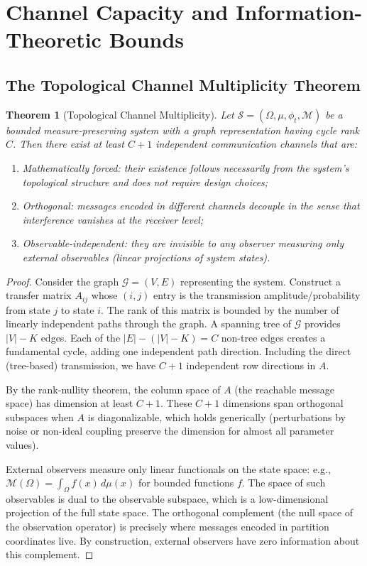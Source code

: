 \documentclass[11pt,twocolumn,a4paper]{article}
\newtheorem{theorem}{Theorem}[section]
\theoremstyle{definition}
\newcommand{\calM}{\mathcal{M}}
\newcommand{\calG}{\mathcal{G}}
\begin{document}
\section{Channel Capacity and Information-Theoretic Bounds}
\label{sec:capacity}

\subsection{The Topological Channel Multiplicity Theorem}

\begin{theorem}[Topological Channel Multiplicity]
\label{thm:topo-mult}
Let $\mathcal{S} = (\Omega, \mu, \phi_t, \calM)$ be a bounded measure-preserving system with a graph representation having cycle rank $C$. Then there exist at least $C+1$ independent communication channels that are:
\begin{enumerate}[nosep,label=(\roman*)]
\item \emph{Mathematically forced}: their existence follows necessarily from the system's topological structure and does not require design choices;
\item \emph{Orthogonal}: messages encoded in different channels decouple in the sense that interference vanishes at the receiver level;
\item \emph{Observable-independent}: they are invisible to any observer measuring only external observables (linear projections of system states).
\end{enumerate}
\end{theorem}

\begin{proof}
Consider the graph $\calG = (V,E)$ representing the system. Construct a transfer matrix $A_{ij}$ whose $(i,j)$ entry is the transmission amplitude/probability from state $j$ to state $i$. The rank of this matrix is bounded by the number of linearly independent paths through the graph. A spanning tree of $\calG$ provides $|V|-K$ edges. Each of the $|E|-(|V|-K)=C$ non-tree edges creates a fundamental cycle, adding one independent path direction. Including the direct (tree-based) transmission, we have $C+1$ independent row directions in $A$.

By the rank-nullity theorem, the column space of $A$ (the reachable message space) has dimension at least $C+1$. These $C+1$ dimensions span orthogonal subspaces when $A$ is diagonalizable, which holds generically (perturbations by noise or non-ideal coupling preserve the dimension for almost all parameter values).

External observers measure only linear functionals on the state space: e.g., $\calM(\Omega) = \int_\Omega f(x)\,d\mu(x)$ for bounded functions $f$. The space of such observables is dual to the observable subspace, which is a low-dimensional projection of the full state space. The orthogonal complement (the null space of the observation operator) is precisely where messages encoded in partition coordinates live. By construction, external observers have zero information about this complement.
\end{proof}
\end{document}
